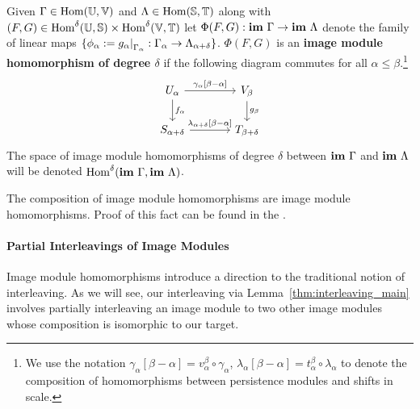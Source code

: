 \begin{definition}
  Given $\Gamma\in\mathrm{Hom}(\mathbb{U},\mathbb{V})$ and $\Lambda\in\mathrm{Hom}(\mathbb{S},\mathbb{T})$ along with $(F,G)\in\mathrm{Hom}^\delta(\mathbb{U},\mathbb{S})\times\mathrm{Hom}^\delta(\mathbb{V},\mathbb{T})$ let $\Phi(F, G) : \mathbf{im}~\Gamma\to\mathbf{im}~\Lambda$ denote the family of linear maps $\{\phi_\alpha := g_\alpha\mathord{\mid}_{\Gamma_\alpha} : \Gamma_\alpha\to\Lambda_{\alpha+\delta}\}$.
  $\Phi(F, G)$ is an \textbf{image module homomorphism of degree $\delta$} if the following diagram commutes for all $\alpha\leq\beta$.\footnote{We use the notation $\gamma_\alpha[\beta-\alpha] = v_\alpha^\beta\circ\gamma_\alpha$, $\lambda_\alpha[\beta-\alpha] = t_\alpha^\beta\circ\lambda_\alpha$ to denote the composition of homomorphisms between persistence modules and shifts in scale.}
  \begin{equation}\label{dgm:image_homomorphism}
    \begin{tikzcd}[column sep=large]
        U_\alpha\arrow{r}{\gamma_\alpha[\beta-\alpha]}\arrow{d}{f_\alpha} &
      V_\beta\arrow{d}{g_\beta}\\
      S_{\alpha+\delta}\arrow{r}{\lambda_{\alpha+\delta}[\beta-\alpha]} &
      T_{\beta +\delta}
  \end{tikzcd}\end{equation}
  The space of image module homomorphisms of degree $\delta$ between $\mathbf{im}~\Gamma$ and $\mathbf{im}~\Lambda$ will be denoted $\mathrm{Hom}^\delta(\mathbf{im}~\Gamma,\mathbf{im}~\Lambda)$.
\end{definition}
%
%
%
The composition of image module homomorphisms are image module homomorphisms.
Proof of this fact can be found in the \fullversion.

\paragraph*{Partial Interleavings of Image Modules}

Image module homomorphisms introduce a direction to the traditional notion of interleaving.
As we will see, our interleaving via Lemma~\ref{thm:interleaving_main} involves partially interleaving an image module to two other image modules whose composition is isomorphic to our target.

